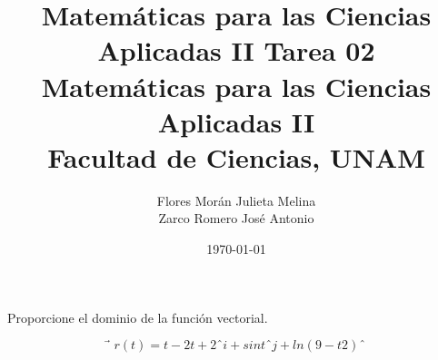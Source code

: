 \documentclass[12pt]{article}
\title{Matemáticas para las Ciencias Aplicadas II}
\title{
	\textbf{Tarea 02} \\
	\vspace{1ex}
	\large Matemáticas para las Ciencias Aplicadas II \\
	Facultad de Ciencias, UNAM}
\date{\today}
\author{Flores Morán Julieta Melina \\ Zarco Romero José Antonio}
\begin{document}
\maketitle

\section{}

Proporcione el dominio de la función vectorial.

$$
⃗r(t) = t−2
t+2
ˆi + sin tˆj + ln(9 − t
2
)
ˆ
$$
\end{document}
